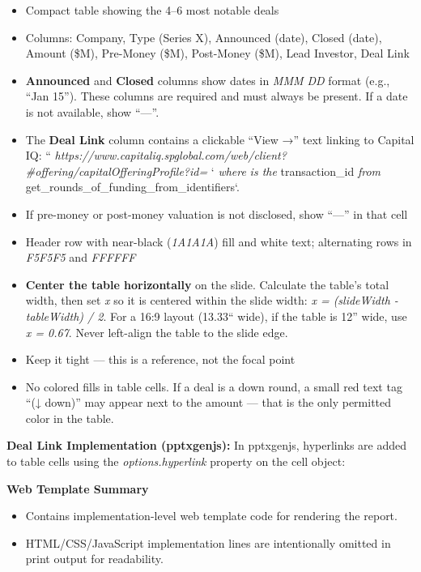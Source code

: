 \documentclass[11pt]{article}
\begin{document}
\begin{itemize}[leftmargin=*,itemsep=2pt,topsep=2pt]
\item {} Compact table showing the 4–6 most notable deals
\item {} Columns: Company, Type (Series X), Announced (date), Closed (date), Amount (\$M), Pre-Money (\$M), Post-Money (\$M), Lead Investor, Deal Link
\item {} \textbf{Announced} and \textbf{Closed} columns show dates in \emph{MMM DD} format (e.g., ``Jan 15''). These columns are required and must always be present. If a date is not available, show ``—''.
\item {} The \textbf{Deal Link} column contains a clickable ``View →'' text linking to Capital IQ: ``\emph{ https://www.capitaliq.spglobal.com/web/client?\#offering/capitalOfferingProfile?id= }`\emph{ where }\emph{ is the }transaction\_\allowbreak{}id\emph{ from }get\_\allowbreak{}rounds\_\allowbreak{}of\_\allowbreak{}funding\_\allowbreak{}from\_\allowbreak{}identifiers`.
\item {} If pre-money or post-money valuation is not disclosed, show ``—'' in that cell
\item {} Header row with near-black (\emph{1A1A1A}) fill and white text; alternating rows in \emph{F5F5F5} and \emph{FFFFFF}
\item {} \textbf{Center the table horizontally} on the slide. Calculate the table's total width, then set \emph{x} so it is centered within the slide width: \emph{x = (slideWidth - tableWidth) / 2}. For a 16:9 layout (13.33`` wide), if the table is 12'' wide, use \emph{x = 0.67}. Never left-align the table to the slide edge.
\item {} Keep it tight — this is a reference, not the focal point
\item {} No colored fills in table cells. If a deal is a down round, a small red text tag ``(↓ down)'' may appear next to the amount — that is the only permitted color in the table.
\end{itemize}

\textbf{Deal Link Implementation (pptxgenjs):} In pptxgenjs, hyperlinks are added to table cells using the \emph{options.hyperlink} property on the cell object:

\textbf{Web Template Summary}
\begin{itemize}[leftmargin=*,itemsep=2pt,topsep=2pt]
\item {} Contains implementation-level web template code for rendering the report.
\item {} HTML/CSS/JavaScript implementation lines are intentionally omitted in print output for readability.
\end{itemize}
\end{document}
